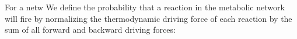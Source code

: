 For a netw
We define the probability that a reaction in the metabolic network will fire by normalizing the thermodynamic driving force of each reaction by the sum of all forward and backward driving forces: